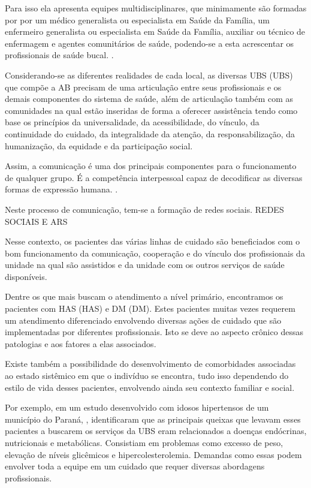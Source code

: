 Para isso ela apresenta equipes multidisciplinares, que minimamente são formadas por por um médico generalista ou especialista em Saúde da Família, um enfermeiro generalista ou especialista em Saúde da Família, auxiliar ou técnico de enfermagem e agentes comunitários de saúde, podendo-se a esta acrescentar os profissionais de saúde bucal. \cite{ministerio2012politica}.

Considerando-se as diferentes realidades de cada local, as diversas \acrlong{UBS} (\acrshort{UBS}) que compõe a \acrshort{AB} precisam de uma articulação entre seus profissionais e os demais componentes do sistema de saúde, além de articulação também com as comunidades na qual estão inseridas de forma a oferecer assistência tendo como base os princípios da universalidade, da acessibilidade, do vínculo, da continuidade do cuidado, da integralidade da atenção, da responsabilização, da humanização, da equidade e da participação social.

Assim, a comunicação é uma dos principais componentes para o funcionamento de qualquer grupo. É a competência interpessoal capaz de decodificar as diversas formas de expressão humana. \cite{rocha2013avaliaccao}.

Neste processo de comunicação, tem-se a formação de redes sociais. REDES SOCIAIS E ARS

Nesse contexto, os pacientes das várias linhas de cuidado são beneficiados com o bom funcionamento da comunicação, cooperação e do vínculo dos profissionais da unidade na qual são assistidos e da unidade com os outros serviços de saúde disponíveis. 

Dentre os que mais buscam o atendimento a nível primário, encontramos os pacientes com \acrlong{HAS} (\acrshort{HAS}) e \acrlong{DM} (\acrshort{DM}). Estes pacientes muitas vezes requerem um atendimento diferenciado envolvendo diversas ações de cuidado que são implementadas por diferentes profissionais. Isto se deve ao aspecto crônico dessas patologias e aos fatores a elas associados. 

Existe também a possibilidade do desenvolvimento de comorbidades associadas ao estado sistêmico em que o indivíduo se encontra, tudo isso dependendo do estilo de vida desses pacientes, envolvendo ainda seu contexto familiar e social. 

Por exemplo, em um estudo desenvolvido com idosos hipertensos de um município do Paraná, \cite{ferrari2014motivos}, identificaram que as principais queixas que levavam esses pacientes a buscarem os serviços da \acrshort{UBS} eram relacionados a doenças endócrinas, nutricionais e metabólicas. Consistiam em problemas como excesso de peso, elevação de níveis glicêmicos e hipercolesterolemia. Demandas como essas podem envolver toda a equipe em um cuidado que requer diversas abordagens profissionais. 

